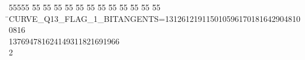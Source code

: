 %
%
\begin{tabbing}
55555 \= 55 \= 55 \= 55 \= 55 \= 55 \= 55 \= 55 \= 55 \= 55 \= 55 \= 55 \= 55 \= \>CURVE\_Q13\_FLAG\_1\_BITANGENTS=1312612191150105961701816429048100816\\[0pt]
137694781624149311821691966\\[0pt]
2\>\end{tabbing}
